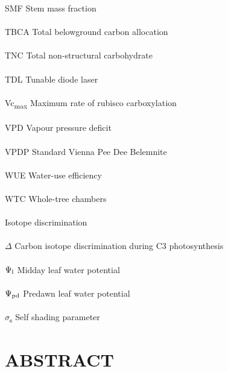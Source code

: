 \documentclass[a4paper]{article}\usepackage[]{graphicx}\usepackage[]{color}
\begin{document}
SMF Stem mass fraction
\\
\\
TBCA Total belowground carbon allocation
\\
\\
TNC Total non-structural carbohydrate
\\
\\
TDL Tunable diode laser
\\
\\
Vc\textsubscript{max} Maximum rate of rubisco carboxylation 
\\
\\
VPD Vapour pressure deficit
\\
\\
VPDP Standard Vienna Pee Dee Belemnite
\\
\\
WUE Water-use efficiency
\\
\\
WTC Whole-tree chambers
\\
\\
{\textdelta}  Isotope discrimination
\\
\\
$\Delta$ Carbon isotope discrimination during C3 photosynthesis 
\\
\\
$\Psi\textsubscript{l}$ Midday leaf water potential
\\
\\
$\Psi\textsubscript{pd}$  Predawn leaf water potential
\\
\\
$\sigma$\textsubscript{s} Self shading parameter

\clearpage
\section*{ABSTRACT}
\end{document}
